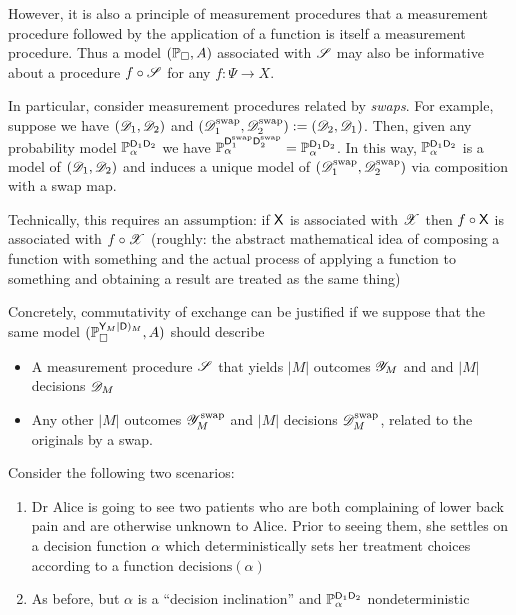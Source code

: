 However, it is also a principle of measurement procedures that a measurement procedure followed by the application of a function is itself a measurement procedure. Thus a model $(\mathbb{P}_\square,A)$ associated with $\mathscr{S}$ may also be informative about a procedure $f\circ \mathscr{S}$ for any $f:\Psi\to X$.

In particular, consider measurement procedures related by \emph{swaps}. For example, suppose we have $(\mathscr{D}_1,\mathscr{D}_2)$ and $(\mathscr{D}^{\text{swap}}_1,\mathscr{D}^{\text{swap}}_2):=(\mathscr{D}_2,\mathscr{D}_1)$. Then, given any probability model $\mathbb{P}_\alpha^{\mathsf{D}_1\mathsf{D}_2}$ we have $\mathbb{P}_\alpha^{\mathsf{D}_1^{\text{swap}}\mathsf{D}_2^{\text{swap}}} = \mathbb{P}_\alpha^{\mathsf{D}_1\mathsf{D}_2}$. In this way, $\mathbb{P}_\alpha^{\mathsf{D}_1\mathsf{D}_2}$ is a model of $(\mathscr{D}_1,\mathscr{D}_2)$ and induces a unique model of $(\mathscr{D}^{\text{swap}}_1,\mathscr{D}^{\text{swap}}_2)$ via composition with a swap map.

Technically, this requires an assumption: if $\mathsf{X}$ is associated with $\mathscr{X}$ then $f\circ \mathsf{X}$ is associated with $f\circ \mathscr{X}$ (roughly: the abstract mathematical idea of composing a function with something and the actual process of applying a function to something and obtaining a result are treated as the same thing)

Concretely, commutativity of exchange can be justified if we suppose that the same model $(\mathbb{P}_\square^{\mathsf{Y}_M|\mathsf{D})_M},A)$ should describe
\begin{itemize}
    \item A measurement procedure $\mathscr{S}$ that yields $|M|$ outcomes $\mathscr{Y}_M$ and and $|M|$ decisions $\mathscr{D}_M$
    \item Any other $|M|$ outcomes $\mathscr{Y}^{\text{swap}}_M$ and $|M|$ decisions $\mathscr{D}^{\text{swap}}_M$, related to the originals by a swap.
\end{itemize}

Consider the following two scenarios:

\begin{enumerate}
    \item Dr Alice is going to see two patients who are both complaining of lower back pain and are otherwise unknown to Alice. Prior to seeing them, she settles on a decision function $\alpha$ which deterministically sets her treatment choices according to a function $\text{decisions}(\alpha)$
    \item As before, but $\alpha$ is a ``decision inclination'' and $\mathbb{P}_\alpha^{\mathsf{D}_1\mathsf{D}_2}$ nondeterministic
\end{enumerate}

